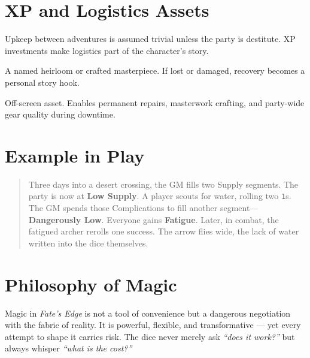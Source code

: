 \documentclass[12pt]{book}
\begin{document}
\section{XP and Logistics Assets}
Upkeep between adventures is assumed trivial unless the party is destitute.
XP investments make logistics part of the character’s story.

\begin{description}[leftmargin=2cm]
  \item[4 XP: Signature Weapon] A named heirloom or crafted masterpiece.
    If lost or damaged, recovery becomes a personal story hook.
  \item[8 XP: Superior Workshop] Off-screen asset. Enables permanent repairs,
    masterwork crafting, and party-wide gear quality during downtime.
\end{description}

\section{Example in Play}
\begin{quote}
Three days into a desert crossing, the GM fills two Supply segments. The party
is now at \textbf{Low Supply}.  
A player scouts for water, rolling two \texttt{1}s. The GM spends those
Complications to fill another segment—\textbf{Dangerously Low}. Everyone gains
\textbf{Fatigue}.  
Later, in combat, the fatigued archer rerolls one success. The arrow flies wide,
the lack of water written into the dice themselves.
\end{quote}

\section{Philosophy of Magic}

Magic in \textit{Fate’s Edge} is not a tool of convenience but a dangerous negotiation with the fabric of reality.  
It is powerful, flexible, and transformative — yet every attempt to shape it carries risk. The dice never merely ask \emph{“does it work?”} but always whisper \emph{“what is the cost?”}
\end{document}
